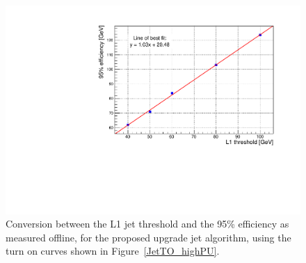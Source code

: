 \begin{figure}[t!]
\begin{center}
  \includegraphics[scale=0.37]{Figures/l1jets/makePlot/jet_95threshold_conv.pdf}
\caption{Conversion between the \ac{L1} jet threshold and the 95\% efficiency as measured offline, for the proposed upgrade jet algorithm, using the turn on curves shown in Figure~\ref{JetTO_highPU}. }
\label{JetRate_conv}
\end{center}
\end{figure}

